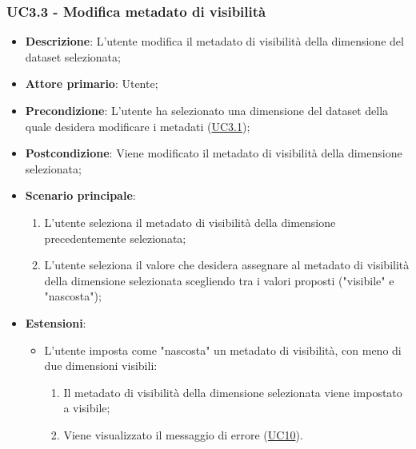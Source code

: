\subsubsection{UC3.3 - Modifica metadato di visibilità}
\label{ssub:uc3.3}

\begin{itemize}
    \item \textbf{Descrizione}: L’utente modifica il metadato di visibilità della dimensione del dataset selezionata;
	
    \item \textbf{Attore primario}: Utente;
    
    \item \textbf{Precondizione}:   L'utente ha selezionato una dimensione del dataset della quale desidera modificare 
    i metadati (\hyperref[ssub:uc3.1]{UC3.1});

    \item \textbf{Postcondizione}:  Viene modificato il metadato di visibilità della dimensione selezionata;

    \item \textbf{Scenario principale}: 
    \begin{enumerate}
        \item L'utente seleziona il metadato di visibilità della dimensione precedentemente selezionata;
        \item L'utente seleziona il valore che desidera assegnare al metadato di visibilità della dimensione 
        selezionata scegliendo tra i valori proposti ("visibile" e "nascosta");
    \end{enumerate}
    
    \item \textbf{Estensioni}:
    \begin{itemize}
        \item L'utente imposta come "nascosta" un metadato di visibilità, con meno di due dimensioni visibili:
        \begin{enumerate}
            \item Il metadato di visibilità della dimensione selezionata viene impostato a 
            visibile;
            \item Viene visualizzato il messaggio di errore (\hyperref[sub:uc10]{UC10}).
        \end{enumerate}
    \end{itemize}
\end{itemize}